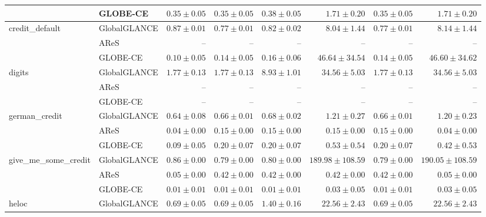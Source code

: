 \begin{table}[ht]
\begin{center}
\begin{sc}
\begin{scriptsize}
\begin{tabular}{l|l|rrrrrr}
 & GLOBE-CE & $\boldsymbol{0.35\pm{0.05}}$ & $\boldsymbol{0.35\pm{0.05}}$ & $\boldsymbol{0.38\pm{0.05}}$ & $\boldsymbol{1.71\pm{0.20}}$ & $\boldsymbol{0.35\pm{0.05}}$ & $\boldsymbol{1.71\pm{0.20}}$ \\
\midrule
\multirow{3}{*}{credit\_default} & GlobalGLANCE & $0.87\pm{0.01}$ & $0.77\pm{0.01}$ & $0.82\pm{0.02}$ & $\boldsymbol{8.04\pm{1.44}}$ & $0.77\pm{0.01}$ & $\boldsymbol{8.14\pm{1.44}}$ \\
 & AReS & -- & -- & -- & -- & -- & -- \\
 & GLOBE-CE & $\boldsymbol{0.10\pm{0.05}}$ & $\boldsymbol{0.14\pm{0.05}}$ & $\boldsymbol{0.16\pm{0.06}}$ & $46.64\pm{34.54}$ & $\boldsymbol{0.14\pm{0.05}}$ & $46.60\pm{34.62}$ \\
\midrule
\multirow{3}{*}{digits} & GlobalGLANCE & $\boldsymbol{1.77\pm{0.13}}$ & $\boldsymbol{1.77\pm{0.13}}$ & $\boldsymbol{8.93\pm{1.01}}$ & $\boldsymbol{34.56\pm{5.03}}$ & $\boldsymbol{1.77\pm{0.13}}$ & $\boldsymbol{34.56\pm{5.03}}$ \\
 & AReS & -- & -- & -- & -- & -- & -- \\
 & GLOBE-CE & -- & -- & -- & -- & -- & -- \\
\midrule
\multirow{3}{*}{german\_credit} & GlobalGLANCE & $0.64\pm{0.08}$ & $0.66\pm{0.01}$ & $0.68\pm{0.02}$ & $1.21\pm{0.27}$ & $0.66\pm{0.01}$ & $1.20\pm{0.23}$ \\
 & AReS & $\boldsymbol{0.04\pm{0.00}}$ & $\boldsymbol{0.15\pm{0.00}}$ & $\boldsymbol{0.15\pm{0.00}}$ & $\boldsymbol{0.15\pm{0.00}}$ & $\boldsymbol{0.15\pm{0.00}}$ & $\boldsymbol{0.04\pm{0.00}}$ \\
 & GLOBE-CE & $0.09\pm{0.05}$ & $0.20\pm{0.07}$ & $0.20\pm{0.07}$ & $0.53\pm{0.54}$ & $0.20\pm{0.07}$ & $0.42\pm{0.53}$ \\
\midrule
\multirow{3}{*}{give\_me\_some\_credit} & GlobalGLANCE & $0.86\pm{0.00}$ & $0.79\pm{0.00}$ & $0.80\pm{0.00}$ & $189.98\pm{108.59}$ & $0.79\pm{0.00}$ & $190.05\pm{108.59}$ \\
 & AReS & $0.05\pm{0.00}$ & $0.42\pm{0.00}$ & $0.42\pm{0.00}$ & $0.42\pm{0.00}$ & $0.42\pm{0.00}$ & $0.05\pm{0.00}$ \\
 & GLOBE-CE & $\boldsymbol{0.01\pm{0.01}}$ & $\boldsymbol{0.01\pm{0.01}}$ & $\boldsymbol{0.01\pm{0.01}}$ & $\boldsymbol{0.03\pm{0.05}}$ & $\boldsymbol{0.01\pm{0.01}}$ & $\boldsymbol{0.03\pm{0.05}}$ \\
\midrule
\multirow{3}{*}{heloc} & GlobalGLANCE & $0.69\pm{0.05}$ & $0.69\pm{0.05}$ & $1.40\pm{0.16}$ & $22.56\pm{2.43}$ & $0.69\pm{0.05}$ & $22.56\pm{2.43}$ \\

\end{tabular}
\end{scriptsize}
\end{sc}
\end{center}
\end{table}

